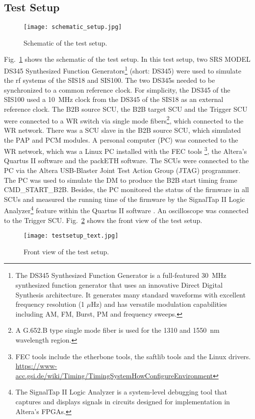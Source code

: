 \subsection{Test Setup}
\label{sec:test_timing}
\begin{figure}[H]
   \centering   
   \texttt{[image: schematic\_setup.jpg]}
   \caption{Schematic of the test setup.}
   \label{setup}
\end{figure}
Fig.~\ref{setup} shows the schematic of the test setup. In this test setup, two SRS MODEL DS345 Synthesized Function Generators\footnote{The DS345 Synthesized Function Generator is a full-featured \SI{30}{\MHz} synthesized function generator that uses an innovative Direct Digital Synthesis architecture. It generates many standard waveforms with excellent frequency resolution (1 $\mu$Hz) and has versatile modulation capabilities including AM, FM, Burst, PM and frequency sweeps.} (short: DS345) were used to simulate the rf systems of the SIS18 and SIS100. The two DS345s needed to be synchronized to a common reference clock. For simplicity, the DS345 of the SIS100 used a \SI{10}{\MHz} clock from the DS345 of the SIS18 as an external reference clock. The B2B source SCU, the B2B target SCU and the Trigger SCU were connected to a WR switch via single mode fibers\footnote{A G.652.B type single mode fiber is used for the 1310 and \SI{1550}{nm} wavelength region.}, which connected to the WR network. There was a SCU slave in the B2B source SCU, which simulated the PAP and PCM modules. A personal computer (\gls{PC}) was connected to the WR network, which was a Linux PC installed with the FEC tools \footnote{FEC tools include the etherbone tools, the saftlib tools and the Linux drivers. \\ \url{https://www-acc.gsi.de/wiki/Timing/TimingSystemHowConfigureEnvironment}}, the Altera's Quartus II software and the packETH software. The SCUs were connected to the PC via the Altera USB-Blaster Joint Test Action Group (JTAG) programmer. The PC was used to simulate the DM to produce the B2B start timing frame CMD\_START\_B2B. Besides, the PC monitored the status of the firmware in all SCUs and measured the running time of the firmware by the SignalTap II Logic Analyzer\footnote{The SignalTap II Logic Analyzer is a system-level debugging tool that captures and displays signals in circuits designed for implementation in Altera’s FPGAs.} feature within the Quartus II software . An oscilloscope was connected to the Trigger SCU. Fig.~\ref{testsetup_text} shows the front view of the test setup. 
\begin{figure}[!htb]
   \centering   
   \texttt{[image: testsetup\_text.jpg]}
   \caption{Front view of the test setup.}
   \label{testsetup_text}
\end{figure}

